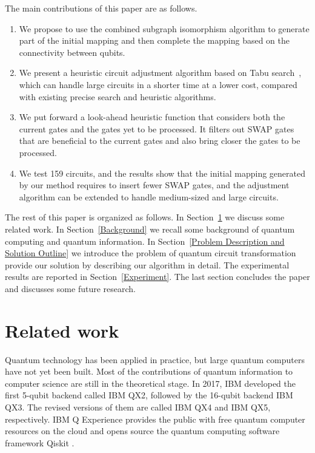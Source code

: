\documentclass[journal]{IEEEtran}
\begin{document}
The main contributions of this paper are as follows.
	\begin{enumerate}
	\item We propose to use the combined subgraph isomorphism algorithm to generate part of the initial mapping
    and then complete the mapping based on the connectivity between qubits.
	\item We present a heuristic circuit adjustment algorithm based on Tabu search~\cite{Glover1990}, which can handle large circuits in a shorter time at a lower cost, compared with existing precise search and heuristic algorithms.
	\item  We put forward a look-ahead heuristic function that considers both the current gates and the  gates yet to be processed. It filters out SWAP gates that are beneficial to the current gates and also bring closer the gates to be processed.
	\item We test 159 circuits, and the results show that the initial mapping generated by our method requires to insert fewer SWAP gates, and the adjustment algorithm can be extended to handle medium-sized and large circuits.
	\end{enumerate}

The rest of this paper is organized as follows.
In Section~\ref{Related work} we discuss some related work. 
In Section~\ref{Background} we recall some background of quantum computing and quantum information. In Section~\ref{Problem Description and Solution Outline}
we introduce the problem of  quantum circuit transformation provide our solution by describing our algorithm in detail.
The experimental results are reported in Section~\ref{Experiment}. 
The last section concludes the paper and discusses some future research.


\section{Related work}
\label{Related work}
Quantum technology has been applied in practice, but large quantum computers have not yet been built. Most of the contributions of quantum information to computer science are still in the theoretical stage. In 2017, IBM developed the first 5-qubit backend called IBM QX2, followed by the 16-qubit backend  IBM QX3. The revised versions of them are called IBM QX4 and IBM QX5, respectively. IBM Q Experience \cite{ibm} provides the public with free quantum computer resources on the cloud and opens source the quantum computing software framework Qiskit \cite{qiskit}. 
\end{document}
